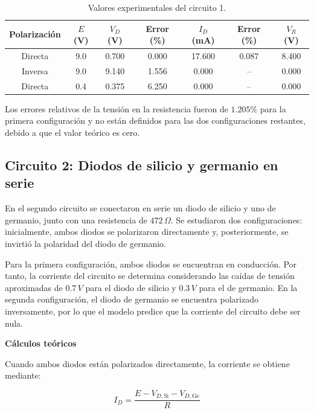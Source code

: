 \begin{table}[H]
\centering
\caption{Valores experimentales del circuito 1.}
\label{tab:c1_experimentales}
\scriptsize
\begin{tabular}{c c c c c c c}
\hline
\textbf{Polarización} & \(E\) (V) &
\(V_D\) (V) & \textbf{Error (\%)} &
\(I_D\) (mA) & \textbf{Error (\%)} &
\(V_R\) (V) \\
\hline
Directa & 9.0 & 0.700 & 0.000 & 17.600 & 0.087 & 8.400 \\
Inversa & 9.0 & 9.140 & 1.556 & 0.000 & -- & 0.000 \\
Directa & 0.4 & 0.375 & 6.250 & 0.000 & -- & 0.000 \\
\hline
\end{tabular}
\end{table}

\noindent
Los errores relativos de la tensión en la resistencia fueron de \(1.205\%\) para la primera configuración y no están definidos para las dos configuraciones restantes, debido a que el valor teórico es cero.

\subsection{Circuito 2: Diodos de silicio y germanio en serie}

En el segundo circuito se conectaron en serie un diodo de silicio y uno de germanio, junto con una resistencia de \(472\,\Omega\). Se estudiaron dos configuraciones: inicialmente, ambos diodos se polarizaron directamente y, posteriormente, se invirtió la polaridad del diodo de germanio.

\vspace{0.3cm}

Para la primera configuración, ambos diodos se encuentran en conducción. Por tanto, la corriente del circuito se determina considerando las caídas de tensión aproximadas de \(0.7\,V\) para el diodo de silicio y \(0.3\,V\) para el de germanio. En la segunda configuración, el diodo de germanio se encuentra polarizado inversamente, por lo que el modelo predice que la corriente del circuito debe ser nula.

\vspace{0.3cm}

\textbf{Cálculos teóricos}

Cuando ambos diodos están polarizados directamente, la corriente se obtiene mediante:

\[
I_D=\frac{E-V_{D,\text{Si}}-V_{D,\text{Ge}}}{R}
\]

